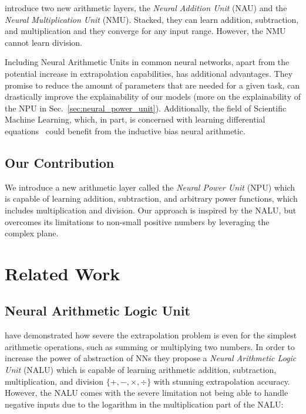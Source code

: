 \documentclass[9pt]{article}
\begin{document}
\cite{madsen_neural_2020} introduce two new arithmetic layers, the \emph{Neural
Addition Unit} (NAU) and the \emph{Neural Multiplication Unit} (NMU).
Stacked, they can learn addition, subtraction, and multiplication and they converge
for any input range. However, the NMU cannot learn division.

Including Neural Arithmetic Units in common neural networks, apart from the
potential increase in extrapolation capabilities, has additional advantages.
They promise to reduce the amount of parameters that are needed for a given
task, can drastically improve the explainability of our models (more on the
explainability of the NPU in Sec.~\ref{sec:neural_power_unit}).  Additionally,
the field of Scientific Machine Learning, which, in part, is concerned with
learning differential equations~\citep{rackauckas_universal_2020} could benefit
from the inductive bias neural arithmetic.


\subsection*{Our Contribution}%
\label{sub:our_contribution}

We introduce a new arithmetic layer called the \emph{Neural Power Unit} (NPU)
which is capable of learning addition, subtraction, and arbitrary power
functions, which includes multiplication and division.
Our approach is inspired by the NALU, but overcomes its limitations to
non-small positive numbers by leveraging the complex plane.

\section{Related Work}%
\label{sec:related_work}

\subsection{Neural Arithmetic Logic Unit}%
\label{sub:neural_arithmetic_logic_unit}

\citet{trask_neural_2018} have demonstrated how severe the extrapolation
problem is even for the simplest arithmetic operations, such as summing or
multiplying two numbers.  In order to increase the power of abstraction of NNs
they propose a \emph{Neural Arithmetic Logic Unit} (NALU) which is capable of
learning arithmetic addition, subtraction, multiplication, and division
$\{+,-,\times,\div\}$ with stunning extrapolation accuracy.  However, the NALU
comes with the severe limitation not being able to handle negative inputs due
to the logarithm in the multiplication part of the NALU:
\end{document}
